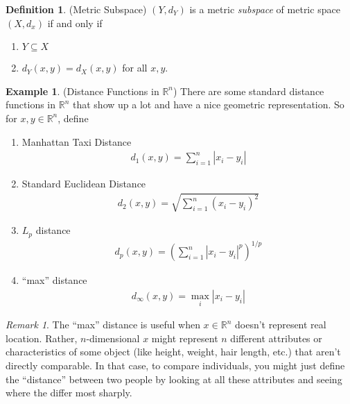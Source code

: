 \documentclass[12pt]{book}
\numberwithin{equation}{section} %
\theoremstyle{plain}
\theoremstyle{definition}
\newtheorem{defn}[thm]{Definition}
\newtheorem{ex}[thm]{Example}
\theoremstyle{remark}
\newtheorem*{rmk}{Remark}
\newcommand{\R}{\mathbb{R}}
\begin{document}
\begin{defn}{(Metric Subspace)}
$(Y,d_Y)$ is a metric \emph{subspace} of metric space $(X,d_x)$ if and
only if
\begin{enumerate}
  \item $Y\subseteq X$
  \item $d_Y(x,y) = d_X(x,y)$ for all $x,y$.
\end{enumerate}
\end{defn}

\begin{ex}{(Distance Functions in $\R^n$)}
There are some standard distance functions in $\R^n$ that show
up a lot and have a nice geometric representation. So for $x,y\in
\R^n$, define
\begin{enumerate}
  \item Manhattan Taxi Distance
    \begin{align*}
      d_1(x,y) = \sum^n_{i=1} |x_i - y_i|
    \end{align*}

  \item Standard Euclidean Distance
    \begin{align*}
      d_2(x,y) = \sqrt{\sum^n_{i=1} (x_i - y_i)^2}
    \end{align*}

  \item $L_p$ distance
    \begin{align*}
      d_p(x,y) = \left(\sum^n_{i=1} |x_i - y_i|^p\right)^{1/p}
    \end{align*}

  \item ``max'' distance
    \begin{align*}
      d_\infty(x,y) = \max_{i} |x_i-y_i|
    \end{align*}

\end{enumerate}
\end{ex}
\begin{rmk}
The ``max'' distance is useful when $x\in\R^n$ doesn't represent
real location. Rather, $n$-dimensional $x$ might represent $n$ different
attributes or characteristics of some object (like height, weight, hair
length, etc.) that aren't directly comparable. In that case, to compare
individuals, you might just define the ``distance'' between two people
by looking at all these attributes and seeing where the differ most
sharply.
\end{rmk}
\end{document}
